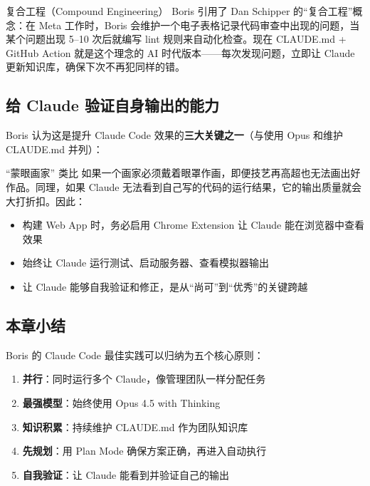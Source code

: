 \begin{knowledgebox}{复合工程（Compound Engineering）}
Boris 引用了 Dan Schipper 的``复合工程''概念：在 Meta 工作时，Boris 会维护一个电子表格记录代码审查中出现的问题，当某个问题出现 5--10 次后就编写 lint 规则来自动化检查。现在 CLAUDE.md + GitHub Action 就是这个理念的 AI 时代版本——每次发现问题，立即让 Claude 更新知识库，确保下次不再犯同样的错。
\end{knowledgebox}

\subsection{给 Claude 验证自身输出的能力}

Boris 认为这是提升 Claude Code 效果的\textbf{三大关键之一}（与使用 Opus 和维护 CLAUDE.md 并列）：

\begin{warningbox}{``蒙眼画家'' 类比}
如果一个画家必须戴着眼罩作画，即便技艺再高超也无法画出好作品。同理，如果 Claude 无法看到自己写的代码的运行结果，它的输出质量就会大打折扣。因此：
\begin{itemize}
    \item 构建 Web App 时，务必启用 Chrome Extension 让 Claude 能在浏览器中查看效果
    \item 始终让 Claude 运行测试、启动服务器、查看模拟器输出
    \item 让 Claude 能够自我验证和修正，是从``尚可''到``优秀''的关键跨越
\end{itemize}
\end{warningbox}

\subsection{本章小结}

Boris 的 Claude Code 最佳实践可以归纳为五个核心原则：
\begin{enumerate}
    \item \textbf{并行}：同时运行多个 Claude，像管理团队一样分配任务
    \item \textbf{最强模型}：始终使用 Opus 4.5 with Thinking
    \item \textbf{知识积累}：持续维护 CLAUDE.md 作为团队知识库
    \item \textbf{先规划}：用 Plan Mode 确保方案正确，再进入自动执行
    \item \textbf{自我验证}：让 Claude 能看到并验证自己的输出
\end{enumerate}

